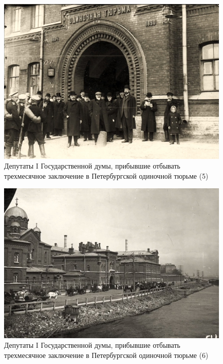 \begin{figure}[h!tb] 
	\centering\includegraphics[scale=0.5]{Vozzvanie/vmMG0Vwk5sw.jpg}
	\caption{Депутаты I Государственной думы, прибывшие отбывать трехмесячное заключение в Петербургской одиночной тюрьме (5)
	}%
\end{figure}
\begin{figure}[h!tb] 
	\centering\includegraphics[scale=0.5]{Vozzvanie/xIJY3iaeRPA.jpg}
	\caption{Депутаты I Государственной думы, прибывшие отбывать трехмесячное заключение в Петербургской одиночной тюрьме (6)
	}%
\end{figure}

